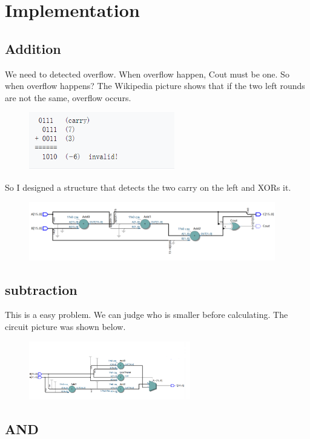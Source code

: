 \documentclass[12pt,a4paper]{article}
\begin{document}
\section{Implementation}
\subsection{Addition}

We need to detected overflow.
When overflow happen, Cout must be one.
So when overflow happens?
The Wikipedia picture shows that if the two left rounds are not the same, overflow occurs.
\begin{figure}[H]
  \centering
  \includegraphics[height=1in]{2.PNG}
  \end{figure}
So I designed a structure that detects the two carry on the left and XORs it.
\begin{figure}[H]
  \centering
  \includegraphics[height=1in]{3.PNG}
  \end{figure}

\subsection{subtraction}

This is a easy problem.
We can judge who is smaller before calculating.
The circuit picture was shown below.
\begin{figure}[H]
  \centering
  \includegraphics[height=1in]{sub.PNG}
  \end{figure}

\subsection{AND}
\end{document}
